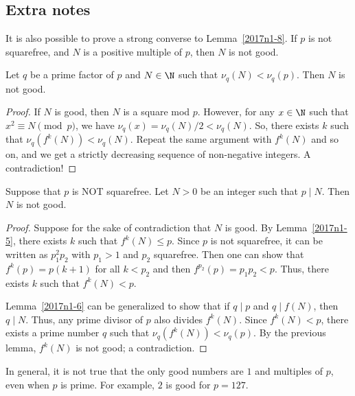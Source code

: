 \subsection*{Extra notes}

It is also possible to prove a strong converse to Lemma~\ref{2017n1-8}.
If $p$ is not squarefree, and $N$ is a positive multiple of $p$, then $N$ is not good.

\begin{lemma}
Let $q$ be a prime factor of $p$ and $N \in \N$ such that $\nu_q(N) < \nu_q(p)$.
Then $N$ is not good.
\end{lemma}
\begin{proof}
If $N$ is good, then $N$ is a square mod $p$.
However, for any $x \in \N$ such that $x^2 \equiv N \pmod{p}$, we have $\nu_q(x) = \nu_q(N)/2 < \nu_q(N)$.
So, there exists $k$ such that $\nu_q(f^k(N)) < \nu_q(N)$.
Repeat the same argument with $f^k(N)$ and so on, and we get a strictly decreasing sequence of non-negative integers.
A contradiction!
\end{proof}

\begin{lemma}
Suppose that $p$ is NOT squarefree.
Let $N > 0$ be an integer such that $p \mid N$.
Then $N$ is not good.
\end{lemma}
\begin{proof}
Suppose for the sake of contradiction that $N$ is good.
By Lemma~\ref{2017n1-5}, there exists $k$ such that $f^k(N) \leq p$.
Since $p$ is not squarefree, it can be written as $p_1^2 p_2$ with $p_1 > 1$ and $p_2$ squarefree.
Then one can show that $f^k(p) = p(k + 1)$ for all $k < p_2$ and then $f^{p_2}(p) = p_1 p_2 < p$.
Thus, there exists $k$ such that $f^k(N) < p$.

Lemma~\ref{2017n1-6} can be generalized to show that if $q \mid p$ and $q \mid f(N)$, then $q \mid N$.
Thus, any prime divisor of $p$ also divides $f^k(N)$.
Since $f^k(N) < p$, there exists a prime number $q$ such that $\nu_q(f^k(N)) < \nu_q(p)$.
By the previous lemma, $f^k(N)$ is not good; a contradiction.
\end{proof}

In general, it is not true that the only good numbers are $1$ and multiples of $p$, even when $p$ is prime.
For example, $2$ is good for $p = 127$.
